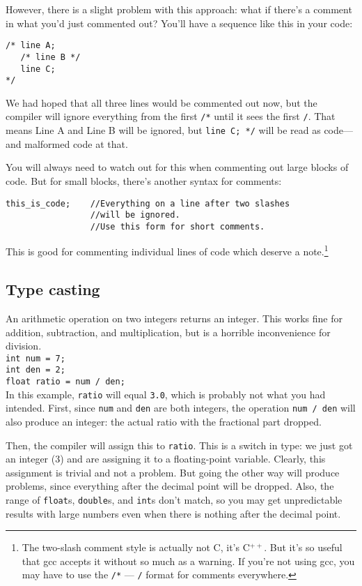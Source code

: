 \documentclass[12pt]{article}
\begin{document}
However, there is a slight problem with this approach: what if there's a comment in what you'd just
commented out? You'll have a sequence like this in your code: 
\begin{verbatim}
/* line A; 
   /* line B */ 
   line C; 
*/
\end{verbatim}
We had hoped that all three lines would be commented out now, but the compiler will ignore everything
from the first {\tt /*} until it sees the first {\tt */}. That means Line A and Line B will be ignored,
but {\tt line C; */} will be read as code---and malformed code at that.

You will always need to watch out for this when commenting out large blocks of code. But for small
blocks, there's another syntax for comments:
\begin{verbatim}
this_is_code;    //Everything on a line after two slashes 
                 //will be ignored.
                 //Use this form for short comments.
\end{verbatim}
This is good for commenting individual lines of code which deserve a note.\footnote{The two-slash
comment style is actually not C, it's C$^{++}$. But it's so useful that gcc accepts it without so much as
a warning. If you're not using gcc, you may have to use the {\tt /*} --- {\tt */} format for comments
everywhere.}

\subsection{Type casting}\label{casting}   An arithmetic operation on two integers returns an integer. This works fine for
addition, subtraction, and multiplication, but is a horrible inconvenience for division.\\
{\tt int num = 7;\\
int den = 2;\\
float ratio = num / den;\\
}
In this example, {\tt ratio} will equal {\tt 3.0}, which is probably not what you had intended. 
First, since {\tt num} and {\tt den} are both integers, the operation
{\tt num / den} will also produce an integer: the actual ratio with the
fractional part dropped.

Then, the compiler will assign this to {\tt ratio}. This is a switch in type: we just got an integer (3)
and are assigning it to a floating-point variable. Clearly, this assignment is trivial and not a problem.
But going the other way will produce problems, since everything after the decimal point will be
dropped.
Also, the range of {\tt float}s, {\tt double}s, and {\tt int}s don't match, so you may get unpredictable
results with large numbers even when there is nothing after the decimal point.
\end{document}
